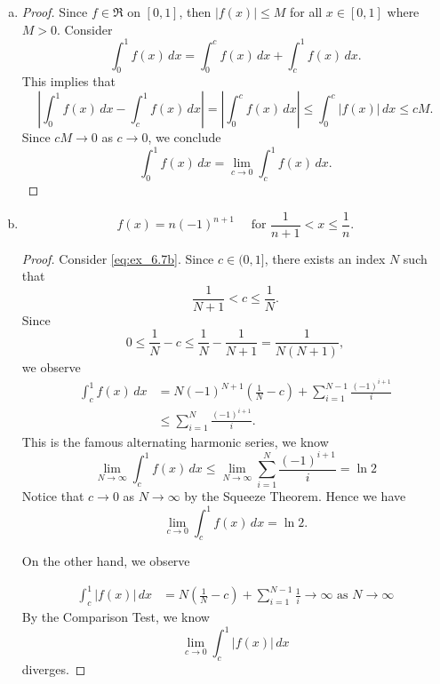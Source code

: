\begin{Exercise}
	\begin{enumerate}[(a)]
		\item 
		\begin{proof}
			Since $f\in\mathfrak{R}$ on $[0,1]$, then $|f(x)| \leq M$ for all $x\in[0,1]$ where $M>0$.
			Consider
			$$
			\int_{0}^{1} f(x)\,dx = \int_{0}^{c}f(x)\, dx + \int_{c}^{1}f(x)\,dx.
			$$
			This implies that
			$$
			\left| \int_{0}^{1} f(x)\,dx - \int_{c}^{1}f(x)\,dx \right|
			= \left| \int_{0}^{c}f(x)\, dx \right|
			\leq \int_{0}^{c} |f(x)|\, dx
			\leq cM.
			$$
			Since $cM\to 0$ as $c \to 0$, we conclude
			$$
			\int_{0}^{1} f(x)\, dx = \lim_{c\to 0}\int_{c}^{1}f(x)\, dx.
			$$
		\end{proof}
		
		\item
		\begin{answer}
			\begin{equation}
			f(x) = n(-1)^{n+1} \quad\mbox{ for } \frac{1}{n+1} < x \leq \frac{1}{n}. \label{eq:ex_6.7b}
			\end{equation}
		\end{answer}
		\begin{proof}
			Consider \eqref{eq:ex_6.7b}.
			Since $c\in(0,1]$, there exists an index $N$ such that
			$$
			\frac{1}{N+1} < c \leq \frac{1}{N}.
			$$
			Since
			$$
			0
			\leq \frac{1}{N} - c 
			\leq \frac{1}{N} - \frac{1}{N+1}
			= \frac{1}{N(N+1)},
			$$
			we observe
			\begin{align*}
			\int_{c}^{1} f(x)\, dx
			&= N(-1)^{N+1}\left( \frac{1}{N} - c \right) + \sum_{i=1}^{N-1} \frac{(-1)^{i+1}}{i} \\
			&\leq \sum_{i=1}^{N} \frac{(-1)^{i+1}}{i}.
			\end{align*}
			This is the famous alternating harmonic series, we know
			$$
			\lim_{N\to\infty} \int_{c}^{1} f(x)\, dx
			\leq \lim_{N\to\infty} \sum_{i=1}^{N} \frac{(-1)^{i+1}}{i}
			= \ln 2
			$$
			Notice that $c\to 0$ as $N\to\infty$ by the Squeeze Theorem.
			Hence we have
			$$
			\lim_{c\to 0} \int_{c}^{1} f(x)\, dx = \ln 2.
			$$
			
			On the other hand, we observe
			
			\begin{align*}
			\int_{c}^{1} |f(x)|\, dx
			&= N \left( \frac{1}{N} - c \right) + \sum_{i=1}^{N-1} \frac{1}{i} \to \infty \text{ as } N\to\infty
			\end{align*}
			By the Comparison Test, we know
			$$
			\lim_{c\to 0} \int_{c}^{1} |f(x)|\, dx
			$$
			diverges.
		\end{proof}
	\end{enumerate}
\end{Exercise}